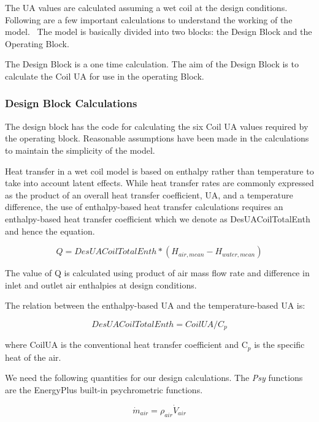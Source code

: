The UA values are calculated assuming a wet coil at the design conditions. Following are a few important calculations to understand the working of the model.~ The model is basically divided into two blocks: the Design Block and the Operating Block.

The Design Block is a one time calculation. The aim of the Design Block is to calculate the Coil UA for use in the operating Block.

\subsubsection{Design Block Calculations}\label{design-block-calculations}

The design block has the code for calculating the six Coil UA values required by the operating block. Reasonable assumptions have been made in the calculations to maintain the simplicity of the model.

Heat transfer in a wet coil model is based on enthalpy rather than temperature to take into account latent effects. While heat transfer rates are commonly expressed as the product of an overall heat transfer coefficient, UA, and a temperature difference, the use of enthalpy-based heat transfer calculations requires an enthalpy-based heat transfer coefficient which we denote as DesUACoilTotalEnth and hence the equation.

\begin{equation}
Q = DesUACoilTotalEnth * (H_{air,mean} - H_{water,mean})
\end{equation}

The value of Q is calculated using product of air mass flow rate and difference in inlet and outlet air enthalpies at design conditions.

The relation between the enthalpy-based UA and the temperature-based UA is:

\begin{equation}
DesUACoilTotalEnth = CoilUA / C_{p}
\end{equation}

where CoilUA is the conventional heat transfer coefficient and C\(_{p}\) is the specific heat of the air.

We need the following quantities for our design calculations. The \emph{Psy} functions are the EnergyPlus built-in psychrometric functions.

\begin{equation}
{\dot m_{air}} = {\rho_{air}}{\dot V_{air}}
\end{equation}

